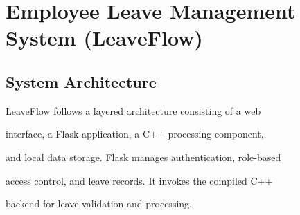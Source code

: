 \documentclass[12pt,a4paper,oneside]{book}
\begin{document}
\mainmatter



\setcounter{chapter}{26}
\chapter{Employee Leave Management System (LeaveFlow)}



\section{System Architecture}



LeaveFlow follows a layered architecture consisting of a web

interface, a Flask application, a C++ processing component,

and local data storage. Flask manages authentication, role-based

access control, and leave records. It invokes the compiled C++

backend for leave validation and processing.
\end{document}
